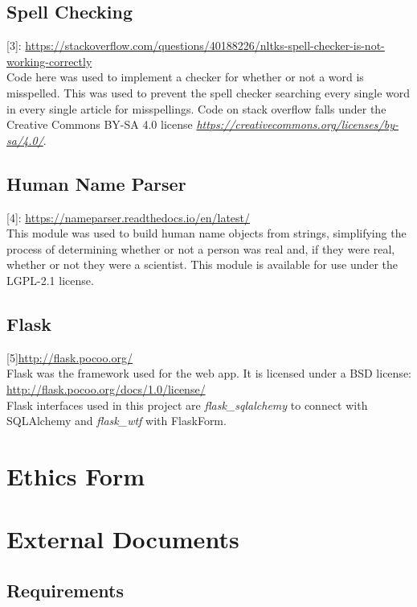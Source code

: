 \documentclass[11pt,a4paper]{book}
\begin{document}
\section{Spell Checking}
\label{appendix:spellchecker}
\color{blue}[3]\color{black}: \url{https://stackoverflow.com/questions/40188226/nltks-spell-checker-is-not-working-correctly}\\
Code here was used to implement a checker for whether or not a word is misspelled. This was used to prevent the spell checker searching every single word in every single article for misspellings. Code on stack overflow falls under the Creative Commons BY-SA 4.0 license \textit{\url{https://creativecommons.org/licenses/by-sa/4.0/}}.

\section{Human Name Parser}
\label{appendix:humanName}
\color{blue}[4]\color{black}: \url{https://nameparser.readthedocs.io/en/latest/}\\
This module was used to build human name objects from strings, simplifying the process of determining whether or not a person was real and, if they were real, whether or not they were a scientist. This module is available for use under the LGPL-2.1 license.

\section{Flask}
\label{appendix:flask}
\color{blue}[5]\color{black}\url{http://flask.pocoo.org/}\\
Flask was the framework used for the web app. It is licensed under a BSD license: \url{http://flask.pocoo.org/docs/1.0/license/}\\
Flask interfaces used in this project are \textit{flask\_sqlalchemy} to connect with SQLAlchemy and \textit{flask\_wtf} with FlaskForm.

\chapter{Ethics Form}


\chapter{External Documents}
\section{Requirements}
\label{appendix:requirements}

\end{document}
